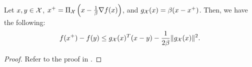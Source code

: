 \begin{lemma} \label{lem:proj_beta_smooth}
Let $x, y \in \mathcal{X}$, $x^+ = \Pi_{\mathcal{X}} \left(x - \frac{1}{\beta} \nabla f(x) \right)$, and $g_{\mathcal{X}}(x) = \beta (x - x^+)$. Then, we have the following:
\[
f(x^+) - f(y) \leq g_{\mathcal{X}}(x)^T (x - y) - \frac{1}{2\beta} \|g_{\mathcal{X}}(x)\|^2.
\]
\begin{proof}
Refer to the proof in \cite[Lemma~3.6]{bubeck}.
\end{proof}
\end{lemma}

